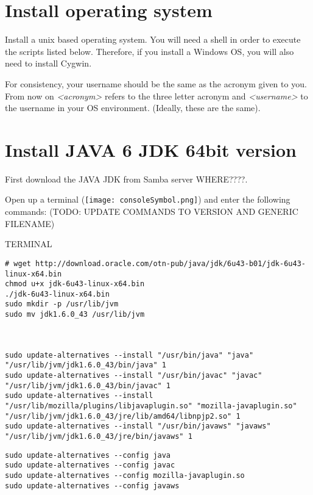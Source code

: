 \documentclass[10pt,a4paper]{article}
\begin{document}
\newpage
\section{Install operating system}
Install a unix based operating system. You will need a shell in order to execute the scripts listed below. Therefore, if you install a Windows OS, you will also need to install Cygwin. %

\vspace{\baselineskip}
\tip{}For consistency, your username should be the same as the acronym given to you. From now on \textit{<acronym>} refers to the three letter acronym and \textit{<username>} to the username in your OS environment. (Ideally, these are the same).

\newpage
\section{Install JAVA 6 JDK 64bit version}
First download the JAVA JDK from Samba server WHERE????. %

Open up a terminal (\texttt{[image: consoleSymbol.png]}) and enter the following commands: (TODO: UPDATE COMMANDS TO VERSION AND GENERIC FILENAME)

\begin{command}{TERMINAL}
\begin{lstlisting}
# wget http://download.oracle.com/otn-pub/java/jdk/6u43-b01/jdk-6u43-linux-x64.bin
chmod u+x jdk-6u43-linux-x64.bin
./jdk-6u43-linux-x64.bin
sudo mkdir -p /usr/lib/jvm
sudo mv jdk1.6.0_43 /usr/lib/jvm



sudo update-alternatives --install "/usr/bin/java" "java" "/usr/lib/jvm/jdk1.6.0_43/bin/java" 1
sudo update-alternatives --install "/usr/bin/javac" "javac" "/usr/lib/jvm/jdk1.6.0_43/bin/javac" 1
sudo update-alternatives --install "/usr/lib/mozilla/plugins/libjavaplugin.so" "mozilla-javaplugin.so" "/usr/lib/jvm/jdk1.6.0_43/jre/lib/amd64/libnpjp2.so" 1
sudo update-alternatives --install "/usr/bin/javaws" "javaws" "/usr/lib/jvm/jdk1.6.0_43/jre/bin/javaws" 1
\end{lstlisting}

\noindent
{}

\begin{lstlisting}
sudo update-alternatives --config java 
sudo update-alternatives --config javac 
sudo update-alternatives --config mozilla-javaplugin.so 
sudo update-alternatives --config javaws
\end{lstlisting}
\end{command}
\end{document}
